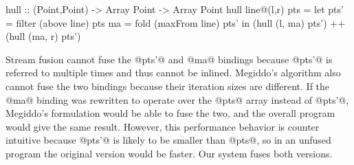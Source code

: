 \begin{code}
hull :: (Point,Point) -> Array Point -> Array Point
hull line@(l,r) pts
 = let pts' = filter (above   line) pts
       ma   = fold   (maxFrom line) pts'
   in (hull (l, ma) pts') ++ (hull (ma, r) pts')
\end{code}

Stream fusion cannot fuse the @pts'@ and @ma@ bindings because @pts'@ is referred to multiple times and thus cannot be inlined. Megiddo's algorithm also cannot fuse the two bindings because their iteration sizes are different. If the @ma@ binding was rewritten to operate over the @pts@ array instead of @pts'@, Megiddo's formulation would be able to fuse the two, and the overall program would give the same result. However, this performance behavior is counter intuitive because @pts'@ is likely to be smaller than @pts@, so in an unfused program the original version would be faster. Our system fuses both versions.

